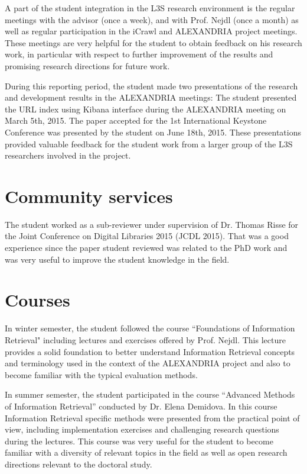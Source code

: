 \documentclass[a4paper,11pt]{report}
\begin{document}
A part of the student integration in the L3S research environment is the regular meetings with the 
advisor (once a week), and with Prof. Nejdl (once a month) 
as well as regular participation in the iCrawl and ALEXANDRIA project meetings.
These meetings are very helpful for the student to 
obtain feedback on his research work, in particular with respect to further improvement of the results
and promising research directions for future work.

During this reporting period, the student made two presentations of the research and development
results in the ALEXANDRIA meetings: The student presented the URL index using Kibana interface during
the ALEXANDRIA meeting on March 5th, 2015. The paper accepted for the 1st International Keystone Conference 
was presented by the student on June 18th, 2015.
%
These presentations provided valuable feedback for the student work from a larger group
of the L3S researchers involved in the project.


\section{Community services}

The student worked as a sub-reviewer under supervision of Dr. Thomas Risse for the 
Joint Conference on Digital Libraries 2015 (JCDL 2015). That was a good experience since
the paper student reviewed was related to the PhD work and was
very useful to improve the student knowledge in the field.

\section{Courses}

In winter semester, the student followed the course ``Foundations of Information Retrieval"
including lectures and exercises offered by Prof. Nejdl. This lecture provides a solid 
foundation to better understand Information Retrieval concepts and terminology
used in the context of the ALEXANDRIA project and also to become familiar with the  
typical evaluation methods. 

In summer semester, the student participated in the course 
``Advanced Methods of Information Retrieval'' conducted by Dr. Elena Demidova. In this course
Information Retrieval specific methods were presented from the practical point of view, 
including implementation exercises and challenging research questions during the lectures.
This course was very useful for the student to become familiar with a diversity
of relevant topics in the field as well as open research directions relevant to the doctoral
study.
\end{document}
